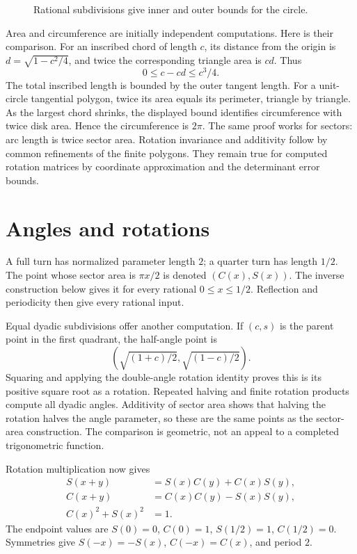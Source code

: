\begin{figure}[htbp]\centering
\rationalCircleSubdivisionAnimation
\caption{Rational subdivisions give inner and outer bounds for the circle.}
\label{fig:rational-parameter-line}
\end{figure}

Area and circumference are initially independent computations.  Here is
their comparison.  For an inscribed chord of length $c$, its distance from
the origin is $d=\sqrt{1-c^2/4}$, and twice the corresponding triangle area
is $cd$.  Thus
\[
 0\le c-cd\le c^3/4.
\]
The total inscribed length is bounded by the outer tangent length.  For a
unit-circle tangential polygon, twice its area equals its perimeter,
triangle by triangle.  As the largest chord shrinks, the displayed bound
identifies circumference with twice disk area.  Hence the circumference is
$2\pi$.  The same proof works for sectors: arc length is twice sector area.
Rotation invariance and additivity follow by common refinements of the
finite polygons.  They remain true for computed rotation matrices by
coordinate approximation and the determinant error bounds.

\section{Angles and rotations}
\label{thm:finite-quarter-turn}
A full turn has normalized parameter length $2$; a quarter turn has length
$1/2$.  The point whose sector area is $\pi x/2$ is denoted $(C(x),S(x))$.
The inverse construction below gives it for every rational
$0\le x\le1/2$.  Reflection and periodicity then give every rational input.

Equal dyadic subdivisions offer another computation.  If $(c,s)$ is the
parent point in the first quadrant, the half-angle point is
\[
 \left(\sqrt{(1+c)/2},\sqrt{(1-c)/2}\right).
\]
Squaring and applying the double-angle rotation identity proves this is its
positive square root as a rotation.  Repeated halving and finite rotation
products compute all dyadic angles.  Additivity of sector area shows that
halving the rotation halves the angle parameter, so these are the same
points as the sector-area construction.  The comparison is geometric,
not an appeal to a completed trigonometric function.

Rotation multiplication now gives
\begin{align*}
 S(x+y)&=S(x)C(y)+C(x)S(y),\\
 C(x+y)&=C(x)C(y)-S(x)S(y),\\
 C(x)^2+S(x)^2&=1.
\end{align*}
The endpoint values are
$S(0)=0$, $C(0)=1$, $S(1/2)=1$, $C(1/2)=0$.
Symmetries give $S(-x)=-S(x)$, $C(-x)=C(x)$, and period $2$.

